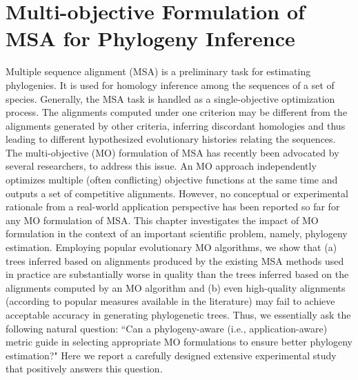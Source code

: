 

\graphicspath{{cybernatics/}}

\chapter{Multi-objective Formulation of MSA for Phylogeny Inference} \label{ch:cybernatics}
 Multiple sequence alignment (MSA) is a preliminary task for estimating phylogenies. It is used for homology inference among the sequences of a set of species. Generally, the MSA task is handled as a single-objective optimization process.
The alignments computed under one criterion may be different from the alignments generated by other criteria, inferring discordant homologies and thus leading to different hypothesized evolutionary histories relating the sequences. The multi-objective (MO) formulation of MSA has recently been advocated by several researchers, to address this issue. An MO approach independently optimizes multiple (often conflicting) objective functions at the same time and outputs a set of competitive alignments. However, no conceptual or experimental rationale from a real-world application perspective has been reported so far for any MO formulation of MSA. This chapter investigates the impact of MO formulation in the context of an important scientific problem, namely, phylogeny estimation. Employing popular evolutionary MO algorithms, we show that (a) trees inferred based on alignments produced by the existing MSA methods used in practice are substantially worse in quality than the trees inferred based on the alignments computed by an MO algorithm and (b) even high-quality alignments (according to popular measures available in the literature) may fail to achieve acceptable accuracy in generating phylogenetic trees.      
Thus, we essentially ask the following natural question: ``Can a phylogeny-aware (i.e., application-aware) metric guide in selecting appropriate MO formulations to ensure better phylogeny estimation?" Here we report a carefully designed extensive experimental study that positively answers this question. 


